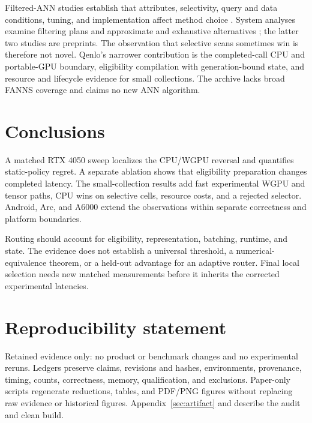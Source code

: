 \documentclass[10pt]{article}
\begin{document}
Filtered-ANN studies establish that attributes, selectivity, query and data conditions, tuning, and implementation affect method choice \citep{iff2026fanns,li2025attribute,shi2025unified}. System analyses examine filtering plans and approximate and exhaustive alternatives \citep{amanbayev2026systems}; the latter two studies are preprints. The observation that selective scans sometimes win is therefore not novel. Qenlo's narrower contribution is the completed-call CPU and portable-GPU boundary, eligibility compilation with generation-bound state, and resource and lifecycle evidence for small collections. The archive lacks broad FANNS coverage and claims no new ANN algorithm.

\section{Conclusions}
A matched RTX 4050 sweep localizes the CPU/WGPU reversal and quantifies static-policy regret. A separate ablation shows that eligibility preparation changes completed latency. The small-collection results add fast experimental WGPU and tensor paths, CPU wins on selective cells, resource costs, and a rejected selector. Android, Arc, and A6000 extend the observations within separate correctness and platform boundaries.

Routing should account for eligibility, representation, batching, runtime, and state. The evidence does not establish a universal threshold, a numerical-equivalence theorem, or a held-out advantage for an adaptive router. Final local selection needs new matched measurements before it inherits the corrected experimental latencies.

\section*{Reproducibility statement}
Retained evidence only: no product or benchmark changes and no experimental reruns. Ledgers preserve claims, revisions and hashes, environments, provenance, timing, counts, correctness, memory, qualification, and exclusions. Paper-only scripts regenerate reductions, tables, and PDF/PNG figures without replacing raw evidence or historical figures. Appendix~\ref{sec:artifact} and  describe the audit and clean build.


\clearpage
\appendix

\end{document}

